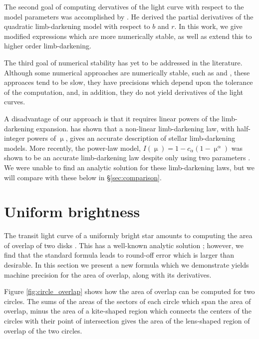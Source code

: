 \documentclass[modern]{aastex61}
\begin{document}
The second goal of computing dervatives of the light curve with respect to
the model parameters was accomplished by \cite{Pal2008}.  He derived the partial 
derivatives of the quadratic limb-darkening model with respect to $b$ and $r$.
In this work, we give modified expressions which are more numerically stable,
as well as extend this to higher order limb-darkening.

The third goal of numerical stability has yet to be addressed in the literature.
Although some numerical approaches are numerically stable, such as \cite{Gimenez2006} 
and \cite{Kreidberg2015}, these approaces tend to be slow, they have precisions
which depend upon the tolerance of the computation, and, in addition, they do not 
yield derivatives of the light curves.

A disadvantage of our approach is that it requires linear powers of the limb-darkening
expansion.  \citet{Claret2000} has shown that a non-linear limb-darkening law,
with half-integer powers of $\upmu$, gives an accurate description of stellar
limb-darkening models.  More recently, the power-law model, $I(\upmu) = 1-
c_\alpha(1-\upmu^\alpha)$ \citep{Hestroffer1997} was shown to be an accurate 
limb-darkening law despite only using two parameters \citep{Maxted2018,
Morello2017}.  We were unable to find an analytic solution for these limb-darkening
laws, but we will compare with these below in \S \ref{sec:comparison}.


%

\section{Uniform brightness}\label{sec:uniform}

The transit light curve of a uniformly bright star amounts to computing the
area of overlap of two disks \citep{MandelAgol2002}.  This has a well-known
analytic solution \citep[e.g.][]{Weisstein2018};  however, we find that the 
standard formula leads to round-off error which is larger than desirable.  In 
this section we present a new formula which we demonstrate yields machine precision 
for the area of overlap, along with its derivatives.

Figure \ref{fig:circle_overlap} shows how the area of overlap can be computed
for two circles.  The sums of the areas of the sectors of each circle which span
the area of overlap, minus the area of a kite-shaped region which connects the
centers of the circles with their point of intersection gives the area of the
lens-shaped region of overlap of the two circles.
\end{document}
